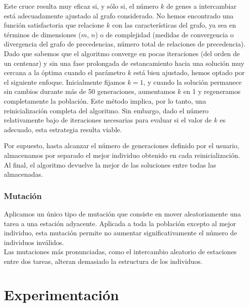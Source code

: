 \documentclass[12pt,a4paper]{report}
\begin{document}
Este cruce resulta muy eficaz si, y sólo si, el número \(k\) de genes a intercambiar está adecuadamente ajustado al grafo considerado. No hemos encontrado una función satisfactoria que relacione \(k\) con las características del grafo, ya sea en términos de dimensiones (\(m\), \(n\)) o de complejidad (medidas de convergencia o divergencia del grafo de precedencias, número total de relaciones de precedencia).\\
Dado que sabemos que el algoritmo converge en pocas iteraciones (del orden de un centenar) y sin una fase prolongada de estancamiento hacia una solución muy cercana a la óptima cuando el parámetro \(k\) está bien ajustado, hemos optado por el siguiente enfoque. Inicialmente fijamos \(k = 1\), y cuando la solución permanece sin cambios durante más de 50 generaciones, aumentamos \(k\) en 1 y regeneramos completamente la población. Este método implica, por lo tanto, una reinicialización completa del algoritmo. Sin embargo, dado el número relativamente bajo de iteraciones necesarias para evaluar si el valor de \(k\) es adecuado, esta estrategia resulta  viable.

Por supuesto, hasta alcanzar el número de generaciones definido por el usuario, almacenamos por separado el mejor individuo obtenido en cada reinicialización. Al final, el algoritmo devuelve la mejor de las soluciones entre todas las almacenadas.


\subsection{Mutación}

Aplicamos un único tipo de mutación que consiste en mover aleatoriamente una tarea a una estación adyacente. Aplicada a toda la población excepto al mejor individuo, esta mutación permite no aumentar significativamente el número de individuos inválidos.\\
Las mutaciones más pronunciadas, como el intercambio aleatorio de estaciones entre dos tareas, alteran demasiado la estructura de los individuos.
\chapter{Experimentación}
\end{document}
